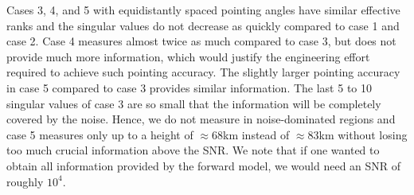 Cases 3, 4, and 5 with equidistantly spaced pointing angles have similar effective ranks and the singular values do not decrease as quickly compared to case 1 and case 2.
Case 4 measures almost twice as much compared to case 3, but does not provide much more information, which would justify the engineering effort required to achieve such pointing accuracy.
The slightly larger pointing accuracy in case 5 compared to case 3 provides similar information.
The last 5 to 10 singular values of case 3 are so small that the information will be completely covered by the noise.
Hence, we do not measure in noise-dominated regions and case 5 measures only up to a height of $\approx 68$km instead of $\approx83$km without losing too much crucial information above the SNR.
We note that if one wanted to obtain all information provided by the forward model, we would need an SNR of roughly $10^4$.
% 
